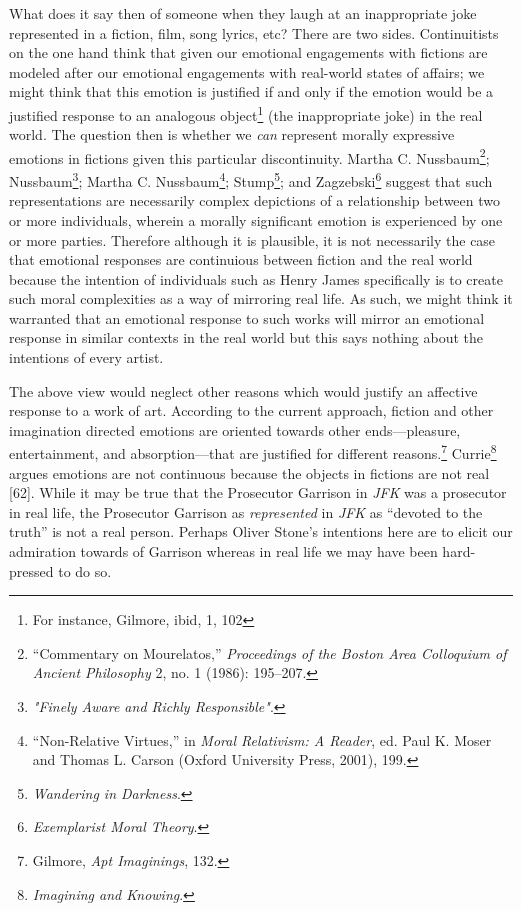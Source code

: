 \documentclass[phdthesis,12pt,final]{wuthesis}
\theoremstyle{definition}
\theoremstyle{definition}
\theoremstyle{definition}
\theoremstyle{definition}
\theoremstyle{remark}
\begin{document}
What does it say then of someone when they laugh at an inappropriate joke represented in a fiction, film, song lyrics, etc? There are two sides. Continuitists on the one hand think that given our emotional engagements with fictions are modeled after our emotional engagements with real-world states of affairs; we might think that this emotion is justified if and only if the emotion would be a justified response to an analogous object\footnote{For instance, Gilmore, ibid, 1, 102} (the inappropriate joke) in the real world. The question then is whether we \emph{can} represent morally expressive emotions in fictions given this particular discontinuity. Martha C. Nussbaum\footnote{{``Commentary on {Mourelatos},''} \emph{Proceedings of the Boston Area Colloquium of Ancient Philosophy} 2, no. 1 (1986): 195--207.}; Nussbaum\footnote{\emph{"{Finely Aware} and {Richly Responsible}"}.}; Martha C. Nussbaum\footnote{{``Non-Relative Virtues,''} in \emph{Moral {Relativism}: {A Reader}}, ed. Paul K. Moser and Thomas L. Carson (Oxford University Press, 2001), 199.}; Stump\footnote{\emph{Wandering in {Darkness}}.}; and Zagzebski\footnote{\emph{Exemplarist {Moral Theory}}.} suggest that such representations are necessarily complex depictions of a relationship between two or more individuals, wherein a morally significant emotion is experienced by one or more parties. Therefore although it is plausible, it is not necessarily the case that emotional responses are continuious between fiction and the real world because the intention of individuals such as Henry James specifically is to create such moral complexities as a way of mirroring real life. As such, we might think it warranted that an emotional response to such works will mirror an emotional response in similar contexts in the real world but this says nothing about the intentions of every artist.

The above view would neglect other reasons which would justify an affective response to a work of art. According to the current approach, fiction and other imagination directed emotions are oriented towards other ends---pleasure, entertainment, and absorption---that are justified for different reasons.\footnote{Gilmore, \emph{Apt {Imaginings}}, 132.} Currie\footnote{\emph{Imagining and Knowing}.} argues emotions are not continuous because the objects in fictions are not real {[}62{]}. While it may be true that the Prosecutor Garrison in \emph{JFK} was a prosecutor in real life, the Prosecutor Garrison as \emph{represented} in \emph{JFK} as ``devoted to the truth'' is not a real person. Perhaps Oliver Stone's intentions here are to elicit our admiration towards of Garrison whereas in real life we may have been hard-pressed to do so.
\end{document}
